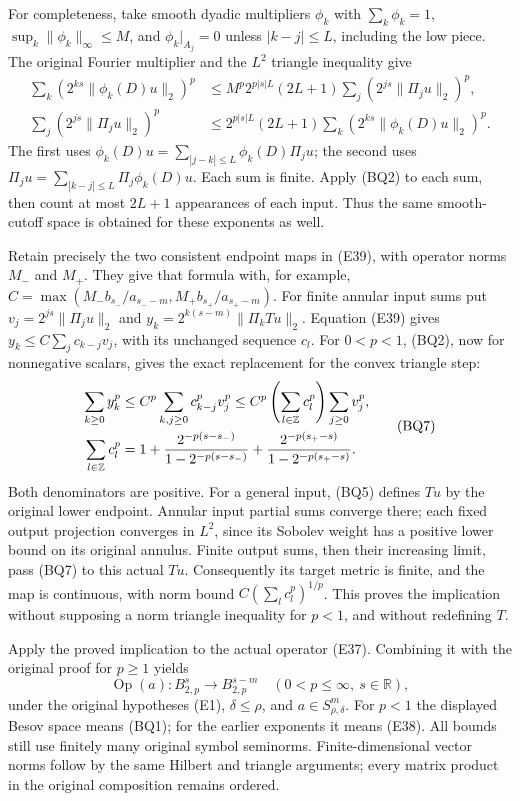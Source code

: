\documentclass[
  11pt,
]{article}
\begin{document}
For completeness, take smooth dyadic multipliers \(\phi_k\) with
\(\sum_k\phi_k=1\), \(\sup_k\|\phi_k\|_\infty\le M\), and
\(\phi_k|_{A_j}=0\) unless \(|k-j|\le L\), including the low piece. The
original Fourier multiplier and the \(L^2\) triangle inequality give \[
\begin{aligned}
\sum_k(2^{ks}\|\phi_k(D)u\|_2)^p
 &\le M^p2^{p|s|L}(2L+1)\sum_j(2^{js}\|\Pi_ju\|_2)^p,\\
\sum_j(2^{js}\|\Pi_ju\|_2)^p
 &\le 2^{p|s|L}(2L+1)\sum_k(2^{ks}\|\phi_k(D)u\|_2)^p.
\end{aligned}
\tag{BQ6}
\] The first uses \(\phi_k(D)u=\sum_{|j-k|\le L}\phi_k(D)\Pi_ju\); the
second uses \(\Pi_ju=\sum_{|k-j|\le L}\Pi_j\phi_k(D)u\). Each sum is
finite. Apply (BQ2) to each sum, then count at most \(2L+1\) appearances
of each input. Thus the same smooth-cutoff space is obtained for these
exponents as well.

Retain precisely the two consistent endpoint maps in (E39), with
operator norms \(M_-\) and \(M_+\). They give that formula with, for
example, \(C=\max(M_-b_{s_-}/a_{s_--m},M_+b_{s_+}/a_{s_+-m})\). For
finite annular input sums put \(v_j=2^{js}\|\Pi_ju\|_2\) and
\(y_k=2^{k(s-m)}\|\Pi_kTu\|_2\). Equation (E39) gives
\(y_k\le C\sum_jc_{k-j}v_j\), with its unchanged sequence \(c_l\). For
\(0<p<1\), (BQ2), now for nonnegative scalars, gives the exact
replacement for the convex triangle step: \[
\begin{aligned}
\sum_{k\ge0}y_k^p
 &\le C^p\sum_{k,j\ge0}c_{k-j}^pv_j^p
 \le C^p\left(\sum_{l\in\mathbb Z}c_l^p\right)\sum_{j\ge0}v_j^p,\\
\sum_{l\in\mathbb Z}c_l^p
 &=1+{2^{-p(s-s_-)}\over1-2^{-p(s-s_-)}}
       +{2^{-p(s_+-s)}\over1-2^{-p(s_+-s)}}.
\end{aligned}
\tag{BQ7}
\] Both denominators are positive. For a general input, (BQ5) defines
\(Tu\) by the original lower endpoint. Annular input partial sums
converge there; each fixed output projection converges in \(L^2\), since
its Sobolev weight has a positive lower bound on its original annulus.
Finite output sums, then their increasing limit, pass (BQ7) to this
actual \(Tu\). Consequently its target metric is finite, and the map is
continuous, with norm bound \(C(\sum_lc_l^p)^{1/p}\). This proves the
implication without supposing a norm triangle inequality for \(p<1\),
and without redefining \(T\).

Apply the proved implication to the actual operator (E37). Combining it
with the original proof for \(p\ge1\) yields \[
\operatorname{Op}(a):B^s_{2,p}\longrightarrow B^{s-m}_{2,p}
\quad(0<p\le\infty,\ s\in\mathbb R),
\tag{BQ8}
\] under the original hypotheses (E1), \(\delta\le\rho\), and
\(a\in S^m_{\rho,\delta}\). For \(p<1\) the displayed Besov space means
(BQ1); for the earlier exponents it means (E38). All bounds still use
finitely many original symbol seminorms. Finite-dimensional vector norms
follow by the same Hilbert and triangle arguments; every matrix product
in the original composition remains ordered.
\end{document}
